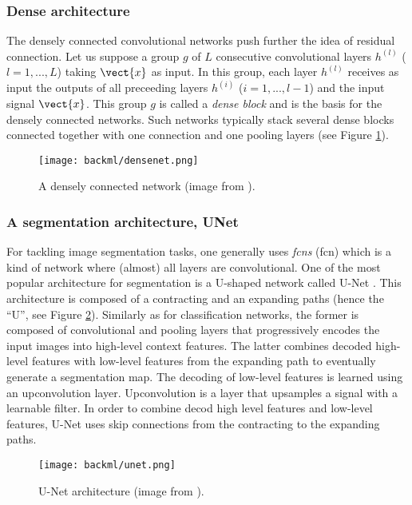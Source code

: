 \subsubsection{Dense architecture}
\label{sssec:backml:arch:dense}
The densely connected convolutional networks \parencite{huang2017densely} push further the idea of residual connection. Let us suppose a group $g$ of $L$ consecutive convolutional layers $h^{(l)}$ ($l = 1, ..., L$) taking $\vect{x}$ as input. In this group, each layer $h^{(l)}$ receives as input the outputs of all preceeding layers $h^{(i)}$ ($i = 1, ..., l-1$) and the input signal $\vect{x}$. This group $g$ is called a \textit{dense block} and is the basis for the densely connected networks. Such networks typically stack several dense blocks connected together with one connection and one pooling layers (see Figure \ref{fig:backml:densenet}).

\begin{figure}
  \centering
  \texttt{[image: backml/densenet.png]}
  \caption{A densely connected network (image from \parencite{huang2017densely}).}
  \label{fig:backml:densenet}
\end{figure}

\subsubsection{A segmentation architecture, UNet}
\label{sssec:backml:arch:segment}

For tackling image segmentation tasks, one generally uses \textit{\acrlong{fcn}s} (\acrshort{fcn}) which is a kind of network where (almost) all layers are convolutional. One of the most popular architecture for segmentation is a U-shaped network called U-Net \parencite{ronneberger2015unet}. This architecture is composed of a contracting and an expanding paths (hence the ``U'', see Figure \ref{fig:backml:unet}). Similarly as for classification networks, the former is composed of convolutional and pooling layers that progressively encodes the input images into high-level context features. The latter combines decoded high-level features with low-level features from the expanding path to eventually generate a segmentation map. The decoding of low-level features is learned using an upconvolution layer. Upconvolution is a layer that upsamples a signal with a learnable filter. In order to combine decod high level features and low-level features, U-Net uses skip connections from the contracting to the expanding paths.

\begin{figure}
  \centering
  \texttt{[image: backml/unet.png]}
  \caption{U-Net architecture (image from \parencite{ronneberger2015unet}).}
  \label{fig:backml:unet}
\end{figure}

